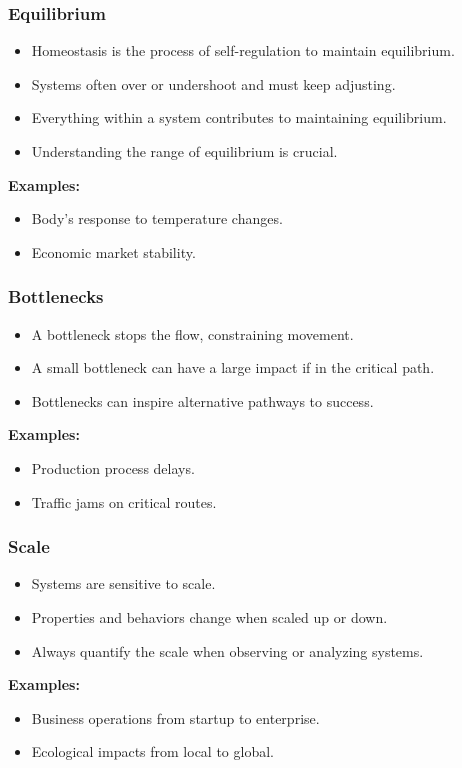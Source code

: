 \begin{frame}[fragile]\frametitle{Equilibrium}
\begin{itemize}
    \item Homeostasis is the process of self-regulation to maintain equilibrium.
    \item Systems often over or undershoot and must keep adjusting.
    \item Everything within a system contributes to maintaining equilibrium.
    \item Understanding the range of equilibrium is crucial.
\end{itemize}
\textbf{Examples:}
\begin{itemize}
    \item Body's response to temperature changes.
    \item Economic market stability.
\end{itemize}
\end{frame}

\begin{frame}[fragile]\frametitle{Bottlenecks}
\begin{itemize}
    \item A bottleneck stops the flow, constraining movement.
    \item A small bottleneck can have a large impact if in the critical path.
    \item Bottlenecks can inspire alternative pathways to success.
\end{itemize}
\textbf{Examples:}
\begin{itemize}
    \item Production process delays.
    \item Traffic jams on critical routes.
\end{itemize}
\end{frame}

\begin{frame}[fragile]\frametitle{Scale}
\begin{itemize}
    \item Systems are sensitive to scale.
    \item Properties and behaviors change when scaled up or down.
    \item Always quantify the scale when observing or analyzing systems.
\end{itemize}
\textbf{Examples:}
\begin{itemize}
    \item Business operations from startup to enterprise.
    \item Ecological impacts from local to global.
\end{itemize}
\end{frame}

